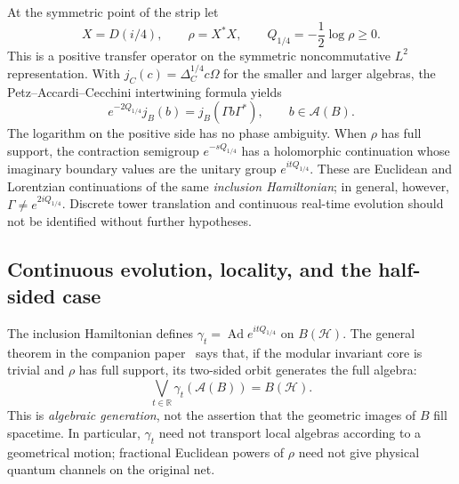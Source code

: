 \documentclass[a4paper,11pt]{article}
\theoremstyle{definition}
\begin{document}
At the symmetric point of the strip let
\begin{equation}
 X=D(i/4),\qquad \rho=X^*X,\qquad
 Q_{1/4}=-\frac12\log\rho\ge0.
 \label{eq:qft-Q-quarter}
\end{equation}
This is a positive transfer operator on the symmetric noncommutative $L^2$ representation. With $j_C(c)=\Delta_C^{1/4}c\Omega$ for the smaller and larger algebras, the Petz--Accardi--Cecchini intertwining formula yields
\begin{equation}
 \boxed{\quad e^{-2Q_{1/4}}j_B(b)
 =j_B(\Gamma b\Gamma^*),\qquad b\in\mathcal A(B).\quad}
 \label{eq:qft-transfer-canonical}
\end{equation}
The logarithm on the positive side has no phase ambiguity. When $\rho$ has full support, the contraction semigroup $e^{-sQ_{1/4}}$ has a holomorphic continuation whose imaginary boundary values are the unitary group $e^{itQ_{1/4}}$. These are Euclidean and Lorentzian continuations of the same \emph{inclusion Hamiltonian}; in general, however, $\Gamma\ne e^{2iQ_{1/4}}$. Discrete tower translation and continuous real-time evolution should not be identified without further hypotheses.

\subsection{Continuous evolution, locality, and the half-sided case}
\label{subsec:qft-time-locality}

The inclusion Hamiltonian defines $\gamma_t=\operatorname{Ad}e^{itQ_{1/4}}$ on $B(\mathcal H)$. The general theorem in the companion paper~\cite{companionQEC} says that, if the modular invariant core is trivial and $\rho$ has full support, its two-sided orbit generates the full algebra:
\begin{equation}
 \bigvee_{t\in\mathbb R}\gamma_t(\mathcal A(B))=B(\mathcal H).
 \label{eq:qft-cited-algebraic-generation}
\end{equation}
This is \emph{algebraic generation}, not the assertion that the geometric images of $B$ fill spacetime. In particular, $\gamma_t$ need not transport local algebras according to a geometrical motion; fractional Euclidean powers of $\rho$ need not give physical quantum channels on the original net.
\end{document}
